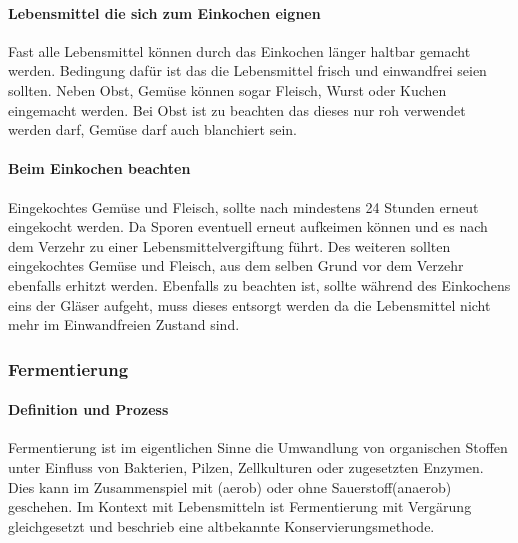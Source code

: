 \paragraph{Lebensmittel die sich zum Einkochen eignen}
Fast alle Lebensmittel können durch das Einkochen länger haltbar gemacht werden. Bedingung dafür ist das die Lebensmittel frisch und einwandfrei seien sollten. Neben Obst, Gemüse können sogar Fleisch, Wurst oder Kuchen eingemacht werden. Bei Obst ist zu beachten das dieses nur roh verwendet werden darf, Gemüse darf auch blanchiert sein. 

\paragraph{Beim Einkochen beachten}
Eingekochtes Gemüse und Fleisch, sollte nach mindestens 24 Stunden erneut eingekocht werden. Da Sporen eventuell erneut aufkeimen können und es nach dem Verzehr zu einer Lebensmittelvergiftung führt. Des weiteren sollten eingekochtes Gemüse und Fleisch, aus dem selben Grund vor dem Verzehr ebenfalls erhitzt werden. Ebenfalls zu beachten ist, sollte während des Einkochens eins der Gläser aufgeht, muss dieses entsorgt werden da die Lebensmittel nicht mehr im Einwandfreien Zustand sind. 



\subsubsection{Fermentierung}
\paragraph{Definition und Prozess}
Fermentierung ist im eigentlichen Sinne die Umwandlung von organischen Stoffen unter Einfluss von Bakterien, Pilzen, Zellkulturen oder zugesetzten Enzymen. Dies kann im Zusammenspiel mit (aerob) oder ohne Sauerstoff(anaerob) geschehen. Im Kontext mit Lebensmitteln ist Fermentierung mit Vergärung gleichgesetzt und beschrieb eine altbekannte Konservierungsmethode. %

